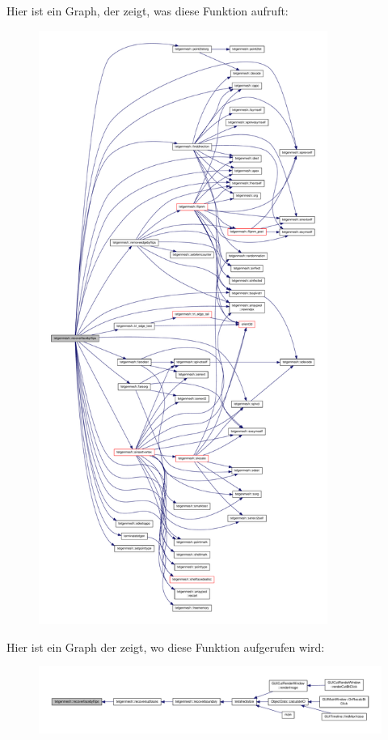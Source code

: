 Hier ist ein Graph, der zeigt, was diese Funktion aufruft\-:\nopagebreak
\begin{figure}[H]
\begin{center}
\leavevmode
\includegraphics[height=550pt]{classtetgenmesh_a38c7fc92a1ced3f4885006837a83c2e6_cgraph}
\end{center}
\end{figure}




Hier ist ein Graph der zeigt, wo diese Funktion aufgerufen wird\-:\nopagebreak
\begin{figure}[H]
\begin{center}
\leavevmode
\includegraphics[width=350pt]{classtetgenmesh_a38c7fc92a1ced3f4885006837a83c2e6_icgraph}
\end{center}
\end{figure}


